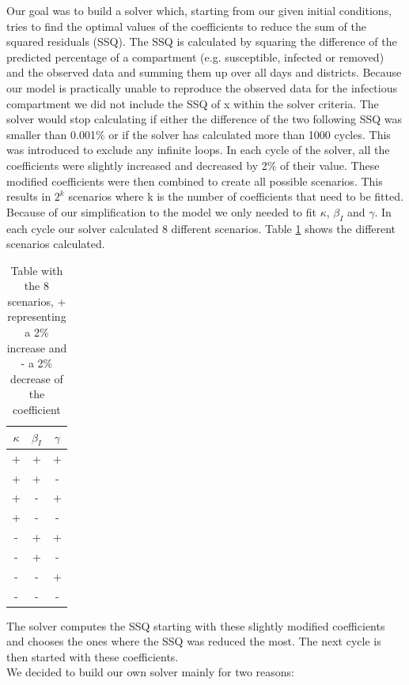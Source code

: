 \documentclass[11pt]{article}
\begin{document}
Our goal was to build a solver which, starting from our given initial conditions, tries to find the optimal values of the coefficients to reduce the sum of the squared residuals (SSQ). The SSQ is calculated by squaring the difference of the predicted percentage of a compartment (e.g. susceptible, infected or removed) and the observed data and summing them up over all days and districts. Because our model is practically unable to reproduce the observed data for the infectious compartment we did not include the SSQ of x within the solver criteria. The solver would stop calculating if either the difference of the two following SSQ was smaller than 0.001\% or if the solver has calculated more than 1000 cycles. This was introduced to exclude any infinite loops. In each cycle of the solver, all the coefficients were slightly increased and decreased by 2\% of their value. These modified coefficients were then combined to create all possible scenarios. This results in $2^{k}$ scenarios where k is the number of coefficients that need to be fitted. Because of our simplification to the model we only needed to fit $\kappa$, $\beta_{I}$ and $\gamma$. In each cycle our solver calculated 8 different scenarios. Table \ref{tab:solverbuild} shows the different scenarios calculated.



\begin{table}[htb]
\caption{Table with the 8 scenarios, + representing a 2\% increase and - a 2\% decrease of the coefficient }
\centering
\begin{tabular}{|c|c|c|}
\hline 
$\kappa$ & $\beta_{I}$ & $\gamma$ \\ 
\hline 
+ & + & + \\ 
\hline 
+ & + & - \\ 
\hline 
+ & - & + \\ 
\hline 
+ & - & - \\ 
\hline 
- & + & + \\ 
\hline 
- & + & - \\ 
\hline 
- & - & + \\ 
\hline 
- & - & - \\ 
\hline 
\end{tabular} 
\label{tab:solverbuild}
\end{table}




The solver computes the SSQ starting with these slightly modified coefficients and chooses the ones where the SSQ was reduced the most. The next cycle is then started with these coefficients.\\
We decided to build our own solver mainly for two reasons:
\end{document}
